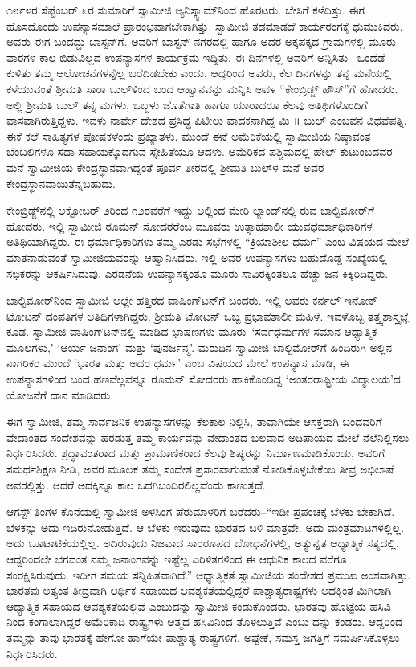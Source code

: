 ೧೮೯೪ರ ಸೆಪ್ಟೆಂಬರ್ ೬ರ ಸುಮಾರಿಗೆ ಸ್ವಾಮೀಜಿ ಆ್ಯನಿಸ್ಕ್ವಾಮ್​ನಿಂದ ಹೊರಟರು. ಬೇಸಿಗೆ ಕಳೆದಿತ್ತು. ಈಗ ಹೊಸದೊಂದು ಉಪನ್ಯಾಸಮಾಲೆ ಪ್ರಾರಂಭವಾಗಬೇಕಾಗಿತ್ತು. ಸ್ವಾಮೀಜಿ ತಡಮಾಡದೆ ಕಾರ್ಯರಂಗಕ್ಕೆ ಧುಮುಕಿದರು. ಅವರು ಈಗ ಬಂದದ್ದು ಬಾಸ್ಟನ್​ಗೆ. ಅವರಿಗೆ ಬಾಸ್ಟನ್ ನಗರದಲ್ಲಿ ಹಾಗೂ ಅದರ ಅಕ್ಕಪಕ್ಕದ ಗ್ರಾಮಗಳಲ್ಲಿ ಮೂರು ವಾರಗಳ ಕಾಲ ಬಿಡುವಿಲ್ಲದ ಉಪನ್ಯಾಸಗಳ ಕಾರ್ಯಕ್ರಮ ಇದ್ದಿತು. ಈ ದಿನಗಳಲ್ಲಿ ಅವರಿಗೆ ಅನ್ನಿಸಿತು– ಒಂದೆಡೆ ಕುಳಿತು ತಮ್ಮ ಆಲೋಚನೆಗಳನ್ನೆಲ್ಲ ಬರೆದಿಡಬೇಕು ಎಂದು. ಆದ್ದರಿಂದ ಅವರು, ಕೆಲ ದಿನಗಳನ್ನು ತನ್ನ ಮನೆಯಲ್ಲಿ ಕಳೆಯುವಂತೆ ಶ್ರೀಮತಿ ಸಾರಾ ಬುಲ್​ಳಿಂದ ಬಂದ ಆಹ್ವಾನವನ್ನು ಮನ್ನಿಸಿ ಅವಳ “ಕೇಂಬ್ರಿಡ್ಜ್ ಹೌಸ್​”ಗೆ ಹೋದರು. ಅಲ್ಲಿ ಶ್ರೀಮತಿ ಬುಲ್ ತನ್ನ ಮಗಳು, ಒಬ್ಬಳು ಜೊತೆಗಾತಿ ಹಾಗೂ ಯಾರಾದರೂ ಕೆಲವು ಅತಿಥಿಗಳೊಂದಿಗೆ ವಾಸವಾಗಿರುತ್ತಿದ್ದಳು. ಇವಳು ನಾರ್ವೇ ದೇಶದ ಪ್ರಸಿದ್ಧ ಪಿಟೀಲು ವಾದಕನಾಗಿದ್ದ ಮಿ ॥ ಬುಲ್ ಎಂಬವನ ವಿಧವೆಪತ್ನಿ. ಈಕೆ ಕಲೆ ಸಾಹಿತ್ಯಗಳ ಪೋಷಕಳೆಂದು ಪ್ರಖ್ಯಾತಳು. ಮುಂದೆ ಈಕೆ ಅಮೆರಿಕೆಯಲ್ಲಿ ಸ್ವಾಮೀಜಿಯ ನಿಷ್ಠಾವಂತ ಬೆಂಬಲಿಗಳೂ ಸದಾ ಸಹಾಯಕ್ಕೊದಗುವ ಸ್ನೇಹಿತೆಯೂ ಆದಳು. ಅಮೆರಿಕದ ಪಶ್ಚಿಮದಲ್ಲಿ ಹೇಲ್ ಕುಟುಂಬದವರ ಮನೆ ಸ್ವಾಮೀಜಿಯ ಕೇಂದ್ರಸ್ಥಾನವಾಗಿದ್ದಂತೆ ಪೂರ್ವ ತೀರದಲ್ಲಿ ಶ್ರೀಮತಿ ಬುಲ್​ಳ ಮನೆ ಅವರ ಕೇಂದ್ರಸ್ಥಾನವಾಯಿತೆನ್ನಬಹುದು.

ಕೇಂಬ್ರಿಡ್ಜ್​ನಲ್ಲಿ ಅಕ್ಟೋಬರ್ ೨ರಿಂದ ೧೨ರವರೆಗೆ ಇದ್ದು ಅಲ್ಲಿಂದ ಮೇರಿ ಲ್ಯಾಂಡ್​ನಲ್ಲಿ ರುವ ಬಾಲ್ಟಿಮೋರ್​ಗೆ ಹೋದರು. ಇಲ್ಲಿ ಸ್ವಾಮೀಜಿ ರೂಮನ್ ಸೋದರರೆಂಬ ಮೂವರು ಉತ್ಸಾಹಶಾಲೀ ಯುವಧರ್ಮಾಧಿಕಾರಿಗಳ ಅತಿಥಿಯಾಗಿದ್ದರು. ಈ ಧರ್ಮಾಧಿಕಾರಿಗಳು ತಮ್ಮ ಎರಡು ಸಭೆಗಳಲ್ಲಿ “ಕ್ರಿಯಾಶೀಲ ಧರ್ಮ” ಎಂಬ ವಿಷಯದ ಮೇಲೆ ಮಾತನಾಡುವಂತೆ ಸ್ವಾಮೀಜಿಯವರನ್ನು ಆಹ್ವಾನಿಸಿದರು. ಇಲ್ಲಿ ಅವರ ಉಪನ್ಯಾಸಗಳು ಬಹುದೊಡ್ಡ ಸಂಖ್ಯೆಯಲ್ಲಿ ಸಭಿಕರನ್ನು ಆಕರ್ಷಿಸಿದುವು. ಎರಡನೆಯ ಉಪನ್ಯಾಸಕ್ಕಂತೂ ಮೂರು ಸಾವಿರಕ್ಕಿಂತಲೂ ಹೆಚ್ಚು ಜನ ಕಿಕ್ಕಿರಿದಿದ್ದರು.

ಬಾಲ್ಟಿಮೋರ್​ನಿಂದ ಸ್ವಾಮೀಜಿ ಅಲ್ಲೇ ಹತ್ತಿರದ ವಾಷಿಂಗ್​ಟನ್​ಗೆ ಬಂದರು. ಇಲ್ಲಿ ಅವರು ಕರ್ನಲ್ ಇನೋಕ್ ಟೋಟನ್ ದಂಪತಿಗಳ ಅತಿಥಿಗಳಾಗಿದ್ದರು. ಶ್ರೀಮತಿ ಟೋಟನ್ ಒಬ್ಬ ಪ್ರಭಾವಶಾಲೀ ಮಹಿಳೆ. ಇವಳೊಬ್ಬ ತತ್ತ್ವಶಾಸ್ತ್ರಜ್ಞೆ ಕೂಡ. ಸ್ವಾಮೀಜಿ ವಾಷಿಂಗ್​ಟನ್​ನಲ್ಲಿ ಮಾಡಿದ ಭಾಷಣಗಳು ಮೂರು–‘ಸರ್ವಧರ್ಮಗಳ ಸಮಾನ ಆಧ್ಯಾತ್ಮಿಕ ಮೂಲಗಳು,’ ‘ಆರ್ಯ ಜನಾಂಗ’ ಮತ್ತು ‘ಪುನರ್ಜನ್ಮ’. ಮರುದಿನ ಸ್ವಾಮೀಜಿ ಬಾಲ್ಟಿಮೋರ್​ಗೆ ಹಿಂದಿರುಗಿ ಅಲ್ಲಿನ ನಾಗರಿಕರ ಮುಂದೆ ‘ಭಾರತ ಮತ್ತು ಅದರ ಧರ್ಮ’ ಎಂಬ ವಿಷಯದ ಮೇಲೆ ಉಪನ್ಯಾಸ ಮಾಡಿ, ಈ ಉಪನ್ಯಾಸಗಳಿಂದ ಬಂದ ಹಣವೆಲ್ಲವನ್ನೂ ರೂಮನ್ ಸೋದರರು ಹಾಕಿಕೊಂಡಿದ್ದ ‘ಅಂತರರಾಷ್ಟ್ರೀಯ ವಿದ್ಯಾಲಯ’ದ ಯೋಜನೆಗೆ ದಾನ ಮಾಡಿದರು.

ಈಗ ಸ್ವಾಮೀಜಿ, ತಮ್ಮ ಸಾರ್ವಜನಿಕ ಉಪನ್ಯಾಸಗಳನ್ನು ಕೆಲಕಾಲ ನಿಲ್ಲಿಸಿ, ತಾವಾಗಿಯೇ ಆಸಕ್ತರಾಗಿ ಬಂದವರಿಗೆ ವೇದಾಂತದ ಸಂದೇಶವನ್ನು ಹರಡುತ್ತ ತಮ್ಮ ಕಾರ್ಯವನ್ನು ವೇದಾಂತದ ಬಲವಾದ ಅಡಿಪಾಯದ ಮೇಲೆ ನೆಲೆನಿಲ್ಲಿಸಲು ನಿರ್ಧರಿಸಿದರು. ಶ್ರದ್ಧಾವಂತರಾದ ಮತ್ತು ಪ್ರಾಮಾಣಿಕರಾದ ಕೆಲವು ಶಿಷ್ಯರನ್ನು ನಿರ್ಮಾಣಮಾಡಿಕೊಂಡು, ಅವರಿಗೆ ಸಮರ್ಥಶಿಕ್ಷಣ ನೀಡಿ, ಅವರ ಮೂಲಕ ತಮ್ಮ ಸಂದೇಶ ಪ್ರಸಾರವಾಗುವಂತೆ ನೋಡಿಕೊಳ್ಳಬೇಕೆಂಬ ತೀವ್ರ ಅಭಿಲಾಷೆ ಅವರಲ್ಲಿತ್ತು. ಆದರೆ ಅದಕ್ಕಿನ್ನೂ ಕಾಲ ಒದಗಿಬಂದಿರಲಿಲ್ಲವೆಂದು ಕಾಣುತ್ತದೆ.

ಆಗಸ್ಟ್ ತಿಂಗಳ ಕೊನೆಯಲ್ಲಿ ಸ್ವಾಮೀಜಿ ಅಳಸಿಂಗ ಪೆರುಮಾಳರಿಗೆ ಬರೆದರು–“ಇಡೀ ಪ್ರಪಂಚಕ್ಕೆ ಬೆಳಕು ಬೇಕಾಗಿದೆ. ಬೆಳಕನ್ನು ಅದು ಇದಿರುನೋಡುತ್ತಿದೆ. ಆ ಬೆಳಕು ಇರುವುದು ಭಾರತದ ಬಳಿ ಮಾತ್ರವೇ. ಅದು ಮಂತ್ರಮಾಟಗಳಲ್ಲಿಲ್ಲ. ಅದು ಬೂಟಾಟಿಕೆಯಲ್ಲಿಲ್ಲ. ಅದಿರುವುದು ನಿಜವಾದ ಸಾರರೂಪದ ಬೋಧನೆಗಳಲ್ಲಿ, ಅತ್ಯುನ್ನತ ಆಧ್ಯಾತ್ಮಿಕ ಸತ್ಯದಲ್ಲಿ. ಆದ್ದರಿಂದಲೇ ಭಗವಂತ ನಮ್ಮ ಜನಾಂಗವನ್ನು ಇಷ್ಟೆಲ್ಲ ಏರಿಳಿತಗಳಿಂದ ಈ ಆಧುನಿಕ ಕಾಲದ ವರೆಗೂ ಸಂರಕ್ಷಿಸಿರುವುದು. ಇದೀಗ ಸಮಯ ಸನ್ನಿಹಿತವಾಗಿದೆ.” ಆಧ್ಯಾತ್ಮಿಕತೆ ಸ್ವಾಮೀಜಿಯ ಸಂದೇಶದ ಪ್ರಮುಖ ಅಂಶವಾಗಿತ್ತು. ಭಾರತವು ಅತ್ಯಂತ ತೀವ್ರವಾಗಿ ಆರ್ಥಿಕ ಸಹಾಯದ ಆವಶ್ಯಕತೆಯಲ್ಲಿದ್ದರೆ ಪಾಶ್ಚಾತ್ಯರಾಷ್ಟ್ರಗಳು ಅದಕ್ಕಿಂತ ಮಿಗಿಲಾಗಿ ಆಧ್ಯಾತ್ಮಿಕ ಸಹಾಯದ ಆವಶ್ಯಕತೆಯಲ್ಲಿವೆ ಎಂಬುದನ್ನು ಸ್ವಾಮೀಜಿ ಕಂಡುಕೊಂಡರು. ಭಾರತವು ಹೊಟ್ಟೆಯ ಹಸಿವಿ ನಿಂದ ಕಂಗಾಲಾಗಿದ್ದರೆ ಅಮೆರಿಕಾದಿ ರಾಷ್ಟ್ರಗಳು ಆತ್ಮದ ಹಸಿವಿನಿಂದ ತೊಳಲುತ್ತಿವೆ ಎಂಬು ದನ್ನು ಕಂಡರು. ಆದ್ದರಿಂದ ತಮ್ಮನ್ನು ತಾವು ಭಾರತಕ್ಕೆ ಹೇಗೋ ಹಾಗೆಯೇ ಪಾಶ್ಚಾತ್ಯ ರಾಷ್ಟ್ರಗಳಿಗೆ, ಅಷ್ಟೇಕೆ, ಸಮಸ್ತ ಜಗತ್ತಿಗೆ ಸಮರ್ಪಿಸಿಕೊಳ್ಳಲು ನಿರ್ಧರಿಸಿದರು.

